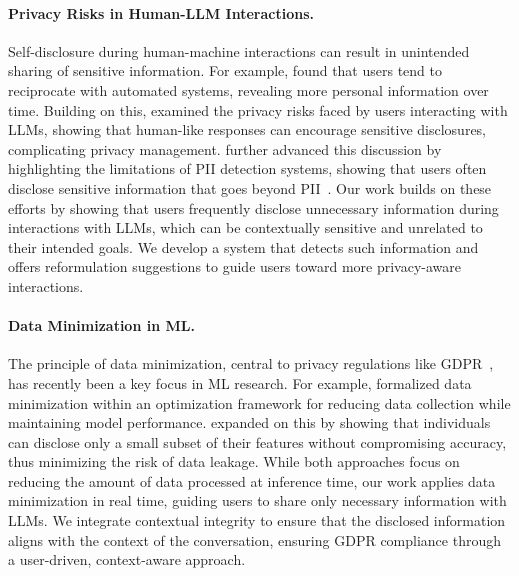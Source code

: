 \paragraph{Privacy Risks in Human-LLM Interactions.}
Self-disclosure during human-machine interactions can result in unintended sharing of sensitive information. For example, \citet{ravichander2018empirical} found that users tend to reciprocate with automated systems, revealing more personal information over time. Building on this, \citet{zhang2024s} examined the privacy risks faced by users interacting with LLMs, showing that human-like responses can encourage sensitive disclosures, complicating privacy management. \citet{mireshghallah2024trust} further advanced this discussion by highlighting the limitations of PII detection systems, showing that users often disclose sensitive information that goes beyond PII~\citep{cummings2023challenges, dou2023reducing}. Our work builds on these efforts by showing that users frequently disclose unnecessary information during interactions with LLMs, which can be contextually sensitive and unrelated to their intended goals. We develop a system that detects such information and offers reformulation suggestions to guide users toward more privacy-aware interactions.

\paragraph{Data Minimization in ML.}
The principle of data minimization, central to privacy regulations like GDPR~\citep{voigt2017eu}, has recently been a key focus in ML research. For example, \citet{ganesh2024data} formalized data minimization within an optimization framework for reducing data collection while maintaining model performance. \citet{tran2024data} expanded on this by showing that individuals can disclose only a small subset of their features without compromising accuracy, thus minimizing the risk of data leakage. While both approaches focus on reducing the amount of data processed at inference time, our work applies data minimization in real time, guiding users to share only necessary information with LLMs. We integrate contextual integrity to ensure that the disclosed information aligns with the context of the conversation, ensuring GDPR compliance through a user-driven, context-aware approach.

